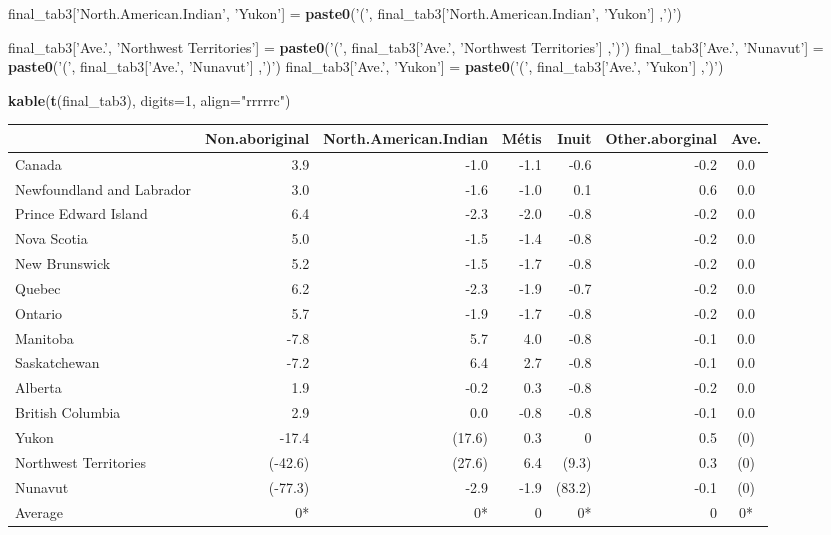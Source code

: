 \documentclass[9pt,letter]{article}
\newenvironment{Shaded}{\begin{snugshade}}{\end{snugshade}}
\newcommand{\KeywordTok}[1]{\textcolor[rgb]{0.13,0.29,0.53}{\textbf{#1}}}
\newcommand{\DataTypeTok}[1]{\textcolor[rgb]{0.13,0.29,0.53}{#1}}
\newcommand{\DecValTok}[1]{\textcolor[rgb]{0.00,0.00,0.81}{#1}}
\newcommand{\StringTok}[1]{\textcolor[rgb]{0.31,0.60,0.02}{#1}}
\newcommand{\NormalTok}[1]{#1}
\begin{document}
\begin{Shaded}
\begin{Highlighting}[]
\NormalTok{final_tab3[}\StringTok{'North.American.Indian'}\NormalTok{, }\StringTok{'Yukon'}\NormalTok{] =}\StringTok{ }
\StringTok{  }\KeywordTok{paste0}\NormalTok{(}\StringTok{'('}\NormalTok{, final_tab3[}\StringTok{'North.American.Indian'}\NormalTok{, }\StringTok{'Yukon'}\NormalTok{] ,}\StringTok{')'}\NormalTok{)}

\NormalTok{final_tab3[}\StringTok{'Ave.'}\NormalTok{, }\StringTok{'Northwest Territories'}\NormalTok{] =}\StringTok{ }
\StringTok{  }\KeywordTok{paste0}\NormalTok{(}\StringTok{'('}\NormalTok{, final_tab3[}\StringTok{'Ave.'}\NormalTok{, }\StringTok{'Northwest Territories'}\NormalTok{] ,}\StringTok{')'}\NormalTok{)}
\NormalTok{final_tab3[}\StringTok{'Ave.'}\NormalTok{, }\StringTok{'Nunavut'}\NormalTok{] =}\StringTok{ }
\StringTok{  }\KeywordTok{paste0}\NormalTok{(}\StringTok{'('}\NormalTok{, final_tab3[}\StringTok{'Ave.'}\NormalTok{, }\StringTok{'Nunavut'}\NormalTok{] ,}\StringTok{')'}\NormalTok{)}
\NormalTok{final_tab3[}\StringTok{'Ave.'}\NormalTok{, }\StringTok{'Yukon'}\NormalTok{] =}\StringTok{ }
\StringTok{  }\KeywordTok{paste0}\NormalTok{(}\StringTok{'('}\NormalTok{, final_tab3[}\StringTok{'Ave.'}\NormalTok{, }\StringTok{'Yukon'}\NormalTok{] ,}\StringTok{')'}\NormalTok{)}

\KeywordTok{kable}\NormalTok{(}\KeywordTok{t}\NormalTok{(final_tab3), }\DataTypeTok{digits=}\DecValTok{1}\NormalTok{, }\DataTypeTok{align=}\StringTok{"rrrrrc"}\NormalTok{)}
\end{Highlighting}
\end{Shaded}

\begin{longtable}[]{@{}lrrrrrc@{}}
\toprule
& Non.aboriginal & North.American.Indian & Métis & Inuit &
Other.aborginal & Ave.\tabularnewline
\midrule
\endhead
Canada & 3.9 & -1.0 & -1.1 & -0.6 & -0.2 & 0.0\tabularnewline
Newfoundland and Labrador & 3.0 & -1.6 & -1.0 & 0.1 & 0.6 &
0.0\tabularnewline
Prince Edward Island & 6.4 & -2.3 & -2.0 & -0.8 & -0.2 &
0.0\tabularnewline
Nova Scotia & 5.0 & -1.5 & -1.4 & -0.8 & -0.2 & 0.0\tabularnewline
New Brunswick & 5.2 & -1.5 & -1.7 & -0.8 & -0.2 & 0.0\tabularnewline
Quebec & 6.2 & -2.3 & -1.9 & -0.7 & -0.2 & 0.0\tabularnewline
Ontario & 5.7 & -1.9 & -1.7 & -0.8 & -0.2 & 0.0\tabularnewline
Manitoba & -7.8 & 5.7 & 4.0 & -0.8 & -0.1 & 0.0\tabularnewline
Saskatchewan & -7.2 & 6.4 & 2.7 & -0.8 & -0.1 & 0.0\tabularnewline
Alberta & 1.9 & -0.2 & 0.3 & -0.8 & -0.2 & 0.0\tabularnewline
British Columbia & 2.9 & 0.0 & -0.8 & -0.8 & -0.1 & 0.0\tabularnewline
Yukon & -17.4 & (17.6) & 0.3 & 0 & 0.5 & (0)\tabularnewline
Northwest Territories & (-42.6) & (27.6) & 6.4 & (9.3) & 0.3 &
(0)\tabularnewline
Nunavut & (-77.3) & -2.9 & -1.9 & (83.2) & -0.1 & (0)\tabularnewline
Average & 0* & 0* & 0 & 0* & 0 & 0*\tabularnewline
\bottomrule
\end{longtable}
\end{document}
